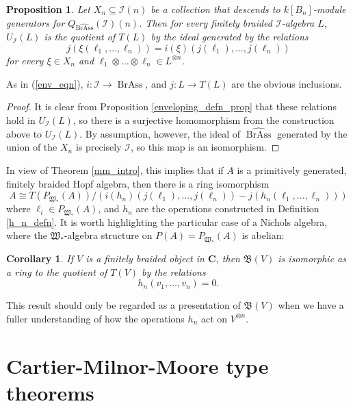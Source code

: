 \documentclass[12pt]{article}
\DeclareMathOperator{\BrAss}{BrAss}
\newcommand{\BrAsshat}{\widehat{\BrAss}} %
\newcommand{\bC} {\mathbf{C}}
\newcommand{\mB}{\mathfrak{B}}
\newcommand{\mW}{\mathfrak{W}}
\newcommand{\II}{\mathcal{I}}
\theoremstyle{plain}
\newtheorem{prop}[thm]{Proposition}
\newtheorem{cor}[thm]{Corollary}
\theoremstyle{definition}
\theoremstyle{remark}
\begin{document}
\begin{prop}

Let $X_n \subseteq \II(n)$ be a collection that descends to $k[B_n]$-module generators for $Q_{\BrAsshat}(\II)(n)$.  Then for every finitely braided $\II$-algebra $L$, $U_{\II}(L)$ is the quotient of $T(L)$ by the ideal generated by the relations
%
$$j(\xi(\ell_1, \dots, \ell_n)) = i(\xi)(j(\ell_1), \dots, j(\ell_n))$$
%
for every $\xi \in X_n$ and $\ell_1 \otimes \dots \otimes \ell_n \in L^{\otimes n}$.

\end{prop}

As in (\ref{env_eqn}), $i: \II \to \BrAsshat$, and $j: L \to T(L)$ are the obvious inclusions. 

\begin{proof}

It is clear from Proposition \ref{enveloping_defn_prop} that these relations hold in $U_{\II}(L)$, so there is a surjective homomorphism from the construction above to $U_{\II}(L)$.  By assumption, however, the ideal of $\BrAsshat$ generated by the union of the $X_n$ is precisely $\II$, so this map is an isomorphism.

\end{proof}

In view of Theorem \ref{mm_intro}, this implies that if $A$ is a primitively generated, finitely braided Hopf algebra, then there is a ring isomorphism
%
$$A \cong T(P_{\mW_*}(A))/(i(h_n)(j(\ell_1), \dots, j(\ell_n)) - j(h_n(\ell_1, \dots, \ell_n)))$$
%
where $\ell_i \in P_{\mW_*}(A)$, and $h_n$ are the operations constructed in Definition \ref{h_n_defn}.  It is worth highlighting the particular case of a Nichols algebra, where the $\mW_*$-algebra structure on $P(A) = P_{\mW_*}(A)$ is abelian:

\begin{cor} 

If $V$ is a finitely braided object in $\bC$, then $\mB(V)$ is isomorphic as a ring to the quotient of $T(V)$ by the relations
%
$$h_n(v_1, \dots, v_n) = 0.$$

\end{cor}

This result should only be regarded as a presentation of $\mB(V)$ when we have a fuller understanding of how the operations $h_n$ act on $V^{\otimes n}$.

\section{Cartier-Milnor-Moore type theorems} \label{cmm_section}
\end{document}
